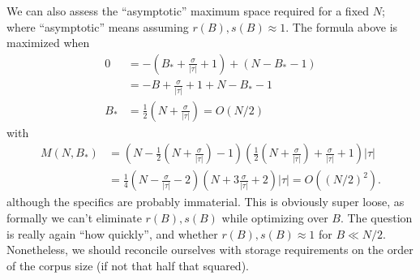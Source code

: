 \documentclass[11pt, oneside]{amsart}   	%
\begin{document}
We can also assess the ``asymptotic'' maximum space required for a fixed $N$; where ``asymptotic'' means assuming $r(B), s(B) \approx 1$. The formula above is maximized when 
\begin{align*}
	0 &= - \left( B_* + \frac{\sigma}{|\tau|} + 1 \right) + (N-B_*-1) \\
		&=  - B + \frac{\sigma}{|\tau|} + 1 + N - B_* - 1 \\ %
	B_* &= \frac{1}{2} \left( N + \frac{\sigma}{|\tau|} \right) = O(N/2)
\end{align*}
with 
\begin{align*}
	M(N, B_*) 
		&= \left( N - \frac{1}{2} \left( N + \frac{\sigma}{|\tau|} \right) - 1 \right) \left( \frac{1}{2} \left( N + \frac{\sigma}{|\tau|} \right) + \frac{\sigma}{|\tau|} + 1 \right) |\tau| \\
		&= \frac{1}{4} \left( N - \frac{\sigma}{|\tau|} - 2 \right) \left( N +  3\frac{\sigma}{|\tau|} + 2 \right) |\tau|
			= O((N/2)^2). 
\end{align*}
although the specifics are probably immaterial. This is obviously super loose, as formally we can't eliminate $r(B), s(B)$ while optimizing over $B$. The question is really again ``how quickly'', and whether $r(B), s(B) \approx 1$ for $B \ll N/2$. Nonetheless, we should reconcile ourselves with storage requirements on the order of the corpus size (if not that half that squared). 

\end{document}

